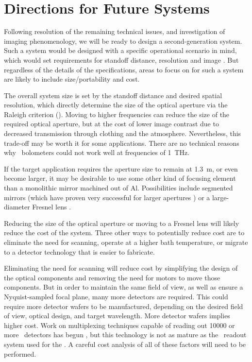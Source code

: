 \section{Directions for Future Systems}

Following resolution of the remaining technical issues, and investigation of imaging phenomenology, we will be ready to design a second-generation system.
Such a system would be designed with a specific operational scenario in mind, which would set requirements for standoff distance, resolution and image \NETD.
But regardless of the details of the specifications, areas to focus on for such a system are likely to include size/portability and cost.

The overall system size is set by the standoff distance and desired spatial resolution, which directly determine the size of the optical aperture via the Raleigh criterion ().
Moving to higher frequencies can reduce the size of the required optical aperture, but at the cost of lower image contrast due to decreased transmission through clothing and the atmosphere.
Nevertheless, this trade-off may be worth it for some applications.
There are no technical reasons why \TES\ bolometers could not work well at frequencies of \SI{1}{\THz}.

If the target application requires the aperture size to remain at \SI{1.3}{\m}, or even become larger, it may be desirable to use some other kind of focusing element than a monolithic mirror machined out of Al.
Possibilities include segmented mirrors (which have proven very successful for larger apertures \cite{fowler_optical_2007}) or a large-diameter Fresnel lens \cite{black_millimeter-wave_1987}.

Reducing the size of the optical aperture or moving to a Fresnel lens will likely reduce the cost of the system.
Three other ways to potentially reduce cost are to eliminate the need for scanning, operate at a higher bath temperature, or migrate to a detector technology that is easier to fabricate.

Eliminating the need for scanning will reduce cost by simplifying the design of the optical components and removing the need for motors to move those components.
But in order to maintain the same field of view, as well as ensure a Nyquist-sampled focal plane, many more detectors are required.
This could require more detector wafers to be manufactured, depending on the desired field of view, optical design, and target wavelength.
More detector wafers implies higher cost.
Work on multiplexing techniques capable of reading out \num{10000} or more \TES\ detectors has begun \cite{irwin_advanced_2012}, but this technology is not as mature as the \TDM\ readout system used for the \Imager.
A careful cost analysis of all of these factors will need to be performed.


